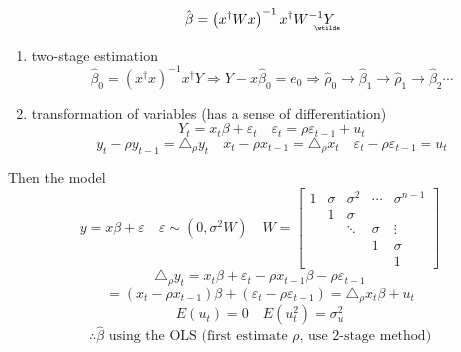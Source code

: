 \documentclass{article}
\begin{document}
\begin{equation*}
\hat{\beta}=\left( x^{\dagger }Wx\right) ^{-1}x^{\dagger }W^{-1}%
\underaccent{\wtilde}{Y}%
\end{equation*}

\begin{enumerate}
\item two-stage estimation%
\begin{equation*}
\hat{\beta}_{0}=\left( x^{\dagger }x\right) ^{-1}x^{\dagger }Y\Rightarrow Y-x%
\hat{\beta}_{0}=e_{0}\Rightarrow \hat{\rho}_{0}\rightarrow \hat{\beta}%
_{1}\rightarrow \hat{\rho}_{1}\rightarrow \hat{\beta}_{2}\cdots
\end{equation*}

\item transformation of variables (has a sense of differentiation)%
\begin{equation*}
Y_{t}=x_{t}\beta +\varepsilon _{t}\quad \varepsilon _{t}=\rho \varepsilon
_{t-1}+u_{t}
\end{equation*}%
\begin{equation*}
y_{t}-\rho y_{t-1}=\triangle _{\rho }y_{t}\quad x_{t}-\rho x_{t-1}=\triangle
_{\rho }x_{t}\quad \varepsilon _{t}-\rho \varepsilon _{t-1}=u_{t}
\end{equation*}
\end{enumerate}

\bigskip

Then the model%
\begin{equation*}
y=x\beta +\varepsilon \quad \varepsilon \sim \left( 0,\sigma ^{2}W\right)
\quad W=\left[ 
\begin{array}{ccccc}
1 & \sigma  & \sigma ^{2} & \cdots  & \sigma ^{n-1} \\ 
& 1 & \sigma  &  &  \\ 
&  & \ddots  & \sigma  & \vdots  \\ 
&  &  & 1 & \sigma  \\ 
&  &  &  & 1%
\end{array}%
\right] 
\end{equation*}%
\begin{equation*}
\triangle _{\rho }y_{t}=x_{t}\beta +\varepsilon _{t}-\rho x_{t-1}\beta -\rho
\varepsilon _{t-1}
\end{equation*}%
\begin{equation*}
=\left( x_{t}-\rho x_{t-1}\right) \beta +\left( \varepsilon _{t}-\rho
\varepsilon _{t-1}\right) =\triangle _{\rho }x_{t}\beta +u_{t}
\end{equation*}%
\begin{equation*}
E\left( u_{t}\right) =0\quad E\left( u_{t}^{2}\right) =\sigma _{u}^{2}
\end{equation*}%
\begin{equation*}
\therefore \hat{\beta}\text{ using the OLS (first estimate }\rho \text{, use
2-stage method)}
\end{equation*}
\end{document}
